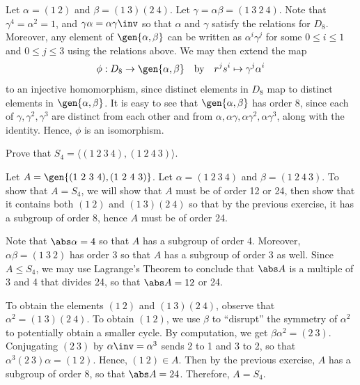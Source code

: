 \begin{sol}
    Let $\alpha = (1\ 2)$ and $\beta = (1\ 3)(2\ 4)$. Let $\gamma = \alpha\beta = (1\ 3\ 2\ 4)$. Note that $\gamma^4 = \alpha^2 = 1$, and $\gamma\alpha = \alpha\gamma\inv$ so that $\alpha$ and $\gamma$ satisfy the relations for $D_8$. Moreover, any element of $\gen{\alpha, \beta}$ can be written as $\alpha^i \gamma^j$ for some $0 \leq i \leq 1$ and $0 \leq j \leq 3$ using the relations above. We may then extend the map
    \[\phi : D_8 \to \gen{\alpha, \beta} \quad \text{by} \quad r^j s^i \mapsto \gamma^j \alpha^i\]
    to an injective homomorphism, since distinct elements in $D_8$ map to distinct elements in $\gen{\alpha, \beta}$. It is easy to see that $\gen{\alpha, \beta}$ has order 8, since each of $\gamma, \gamma^2, \gamma^3$ are distinct from each other and from $\alpha, \alpha\gamma, \alpha\gamma^2, \alpha\gamma^3$, along with the identity. Hence, $\phi$ is an isomorphism.
\end{sol}

\begin{exercise} \label{ex2.4.8} 
    Prove that $S_4 = \langle (1\ 2\ 3\ 4), (1\ 2\ 4\ 3)\rangle$.
\end{exercise}

\begin{sol}
    Let $A = \gen{(1\ 2\ 3\ 4), (1\ 2\ 4\ 3)}$. Let $\alpha = (1\ 2\ 3\ 4)$ and $\beta = (1\ 2\ 4\ 3)$. To show that $A = S_4$, we will show that $A$ must be of order 12 or 24, then show that it contains both $(1\ 2)$ and $(1\ 3)(2\ 4)$ so that by the previous exercise, it has a subgroup of order 8, hence $A$ must be of order 24.

    Note that $\abs\alpha = 4$ so that $A$ has a subgroup of order 4. Moreover, $\alpha\beta = (1\ 3\ 2)$ has order 3 so that $A$ has a subgroup of order 3 as well. Since $A \leq S_4$, we may use Lagrange's Theorem to conclude that $\abs A$ is a multiple of 3 and 4 that divides 24, so that $\abs A = 12$ or 24.

    To obtain the elements $(1\ 2)$ and $(1\ 3)(2\ 4)$, observe that $\alpha^2 = (1\ 3)(2\ 4)$. To obtain $(1\ 2)$, we use $\beta$ to ``disrupt'' the symmetry of $\alpha^2$ to potentially obtain a smaller cycle. By computation, we get $\beta\alpha^2 = (2\ 3)$. Conjugating $(2\ 3)$ by $\alpha\inv = \alpha^3$ sends 2 to 1 and 3 to 2, so that $\alpha^3(2\ 3)\alpha = (1\ 2)$. Hence, $(1\ 2) \in A$. Then by the previous exercise, $A$ has a subgroup of order 8, so that $\abs A = 24$. Therefore, $A = S_4$.
\end{sol}

